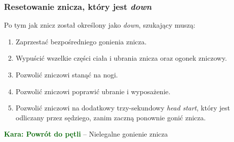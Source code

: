 \documentclass[11pt,a4paper]{article}
\newcommand\penaltyd[2]{\bgroup\textcolor{darkgreen}{\textbf{Kara: #1}} -- #2}
\begin{document}
\subsubsection{Resetowanie znicza, który jest \emph{down}}
Po tym jak znicz został określony jako \emph{down}, szukający muszą:
\begin{enumerate}
  \item Zaprzestać bezpośredniego gonienia znicza.
  \item Wypuścić wszelkie części ciała i ubrania znicza oraz ogonek zniczowy.
  \item Pozwolić zniczowi stanąć na nogi.
  \item Pozwolić zniczowi poprawić ubranie i wyposażenie.
  \item Pozwolić zniczowi na dodatkowy trzy-sekundowy \emph{head start}, który jest odliczany przez sędziego, zanim zaczną ponownie gonić znicza.
\end{enumerate}

\penaltyd{Powrót do pętli}{Nielegalne gonienie znicza}

%
%
%
%
%
%

\newpage
\end{document}
